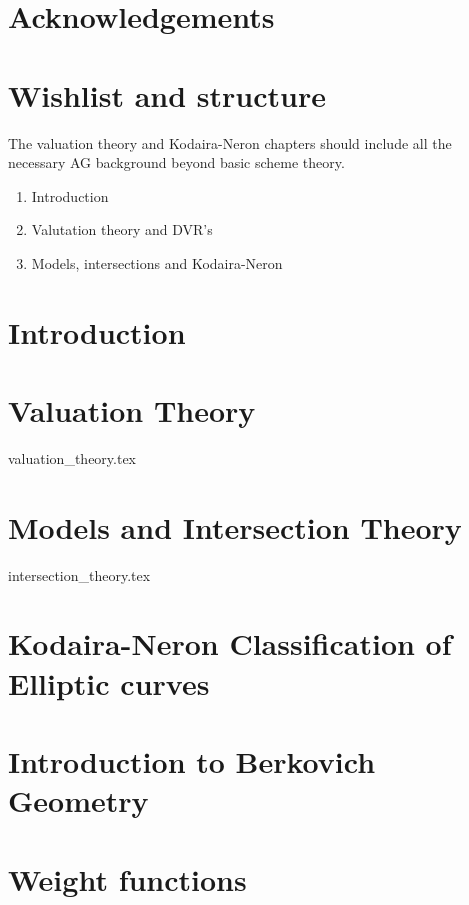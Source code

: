 


\rmfamily
\setcounter{page}{0}
\newpage
\tableofcontents
\listoftodos
\chapter*{Acknowledgements} \label{chap:acknowledgements}

\setcounter{chapter}{-1}
\chapter{Wishlist and structure} \label{chap:wishlist}
The valuation theory and Kodaira-Neron chapters should include all the necessary AG background beyond basic scheme theory. 
\begin{enumerate}
	\item Introduction
	\item Valutation theory and DVR's
	\item Models, intersections and Kodaira-Neron
\end{enumerate}


\setcounter{page}{0}

\chapter{Introduction} \label{chap:introduction}


\chapter{Valuation Theory} \label{chap:valuation_theory}
{valuation_theory.tex}



\chapter{Models and Intersection Theory} \label{chap:models_and_intersection_theory}
{intersection_theory.tex}

\chapter{Kodaira-Neron Classification of Elliptic curves} \label{chap:kodaira-neron_classification_of_elliptic_curves}

\chapter{Introduction to Berkovich Geometry} \label{chap:affinoid_algerbas}


\chapter{Weight functions} \label{chap:weight_functions}


\pagebreak
\printbibliography


